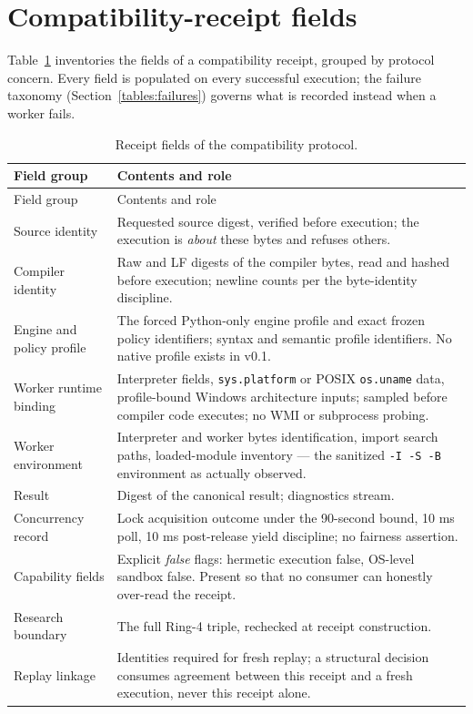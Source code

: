 \section{Compatibility-receipt fields}\label{tables:receipt}

Table~\ref{tables:tab:receipt} inventories the fields of a compatibility receipt, grouped by protocol concern. Every field is populated on every successful execution; the failure taxonomy (Section~\ref{tables:failures}) governs what is recorded instead when a worker fails.

\begin{longtable}{@{}p{}p{}@{}}
\caption{Receipt fields of the compatibility protocol.}\label{tables:tab:receipt}\\
\toprule
Field group & Contents and role \\
\midrule
\endfirsthead
\toprule
Field group & Contents and role \\
\midrule
\endhead
\bottomrule
\endfoot
Source identity & Requested source digest, verified before execution; the execution is \emph{about} these bytes and refuses others. \\
\addlinespace
Compiler identity & Raw and LF digests of the compiler bytes, read and hashed before execution; newline counts per the byte-identity discipline. \\
\addlinespace
Engine and policy profile & The forced Python-only engine profile and exact frozen policy identifiers; syntax and semantic profile identifiers. No native profile exists in v0.1. \\
\addlinespace
Worker runtime binding & Interpreter fields, \texttt{sys.platform} or POSIX \texttt{os.uname} data, profile-bound Windows architecture inputs; sampled before compiler code executes; no WMI or subprocess probing. \\
\addlinespace
Worker environment & Interpreter and worker bytes identification, import search paths, loaded-module inventory --- the sanitized \texttt{-I -S -B} environment as actually observed. \\
\addlinespace
Result & Digest of the canonical result; diagnostics stream. \\
\addlinespace
Concurrency record & Lock acquisition outcome under the 90-second bound, 10 ms poll, 10 ms post-release yield discipline; no fairness assertion. \\
\addlinespace
Capability fields & Explicit \emph{false} flags: hermetic execution false, OS-level sandbox false. Present so that no consumer can honestly over-read the receipt. \\
\addlinespace
Research boundary & The full Ring-4 triple, rechecked at receipt construction. \\
\addlinespace
Replay linkage & Identities required for fresh replay; a structural decision consumes agreement between this receipt and a fresh execution, never this receipt alone. \\
\end{longtable}

